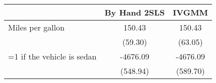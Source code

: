 \begin{tabular}{lcc}
\toprule
 & By Hand 2SLS & IVGMM \\
\midrule
Miles per gallon & 150.43 & 150.43 \\
  & (59.30) & (63.05) \\
=1 if the vehicle is sedan & -4676.09 & -4676.09 \\
  & (548.94) & (589.70) \\
\bottomrule
\end{tabular}
